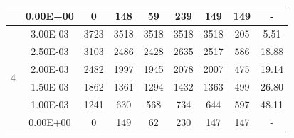 \begin{table}[H]
{\begin{tabular}{|c|c|c|c|c|c|c|c|c|}
                               & 0.00E+00         & 0         & 148                                                        & 59                                                        & 239                                                       & 149     & 149    & -                                                                  \\ \hline
            \multirow{6}{*}{4} & 3.00E-03         & 3723      & 3518                                                       & 3518                                                      & 3518                                                      & 3518    & 205    & 5.51                                                               \\ \cline{2-9}
                               & 2.50E-03         & 3103      & 2486                                                       & 2428                                                      & 2635                                                      & 2517    & 586    & 18.88                                                              \\ \cline{2-9}
                               & 2.00E-03         & 2482      & 1997                                                       & 1945                                                      & 2078                                                      & 2007    & 475    & 19.14                                                              \\ \cline{2-9}
                               & 1.50E-03         & 1862      & 1361                                                       & 1294                                                      & 1432                                                      & 1363    & 499    & 26.80                                                              \\ \cline{2-9}
                               & 1.00E-03         & 1241      & 630                                                        & 568                                                       & 734                                                       & 644     & 597    & 48.11                                                              \\ \cline{2-9}
                               & 0.00E+00         & 0         & 149                                                        & 62                                                        & 230                                                       & 147     & 147    & -                                                                  \\ \hline

\end{tabular}}
\end{table}

